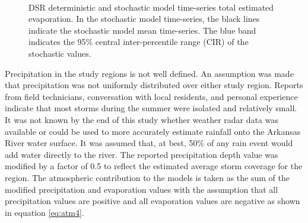 \begin{linenumbers}
\begin{landscape}
\begin{figure}
\begin{subfigure}{0.7\textwidth}
		\end{subfigure}\\
		\caption[DSR deterministic and stochastic model time-series total estimated evaporation.]{DSR deterministic and stochastic model time-series total estimated evaporation.  In the stochastic model time-series, the black lines indicate the stochastic model mean time-series.  The blue band indicates the 95\% central inter-percentile range (CIR) of the stochastic values.}
		\label{fig:reachEvap_DS}
	\end{figure}
\end{landscape}

\subtabletop
\begin{table}[htbp]
	\centering
	\caption[USR deterministic and stochastic model time-series total estimated evaporation numeric results.]{USR deterministic and stochastic model time-series total estimated evaporation numeric results.  Total daily evaporation rates are presented in units of \si{\milli\meter} (\si{\inch}).}
	\label{tab:reachEvap_US}
	
\end{table}
\tablevspace
\begin{table}[htbp]
	\centering
	\caption[DSR deterministic and stochastic model time-series total estimated evaporation numeric results.]{DSR deterministic and stochastic model time-series total estimated evaporation numeric results.  Total daily evaporation rates are presented in units of \si{\milli\meter} (\si{\inch}).}
	\label{tab:reachEvap_DS}
	
\end{table}

Precipitation in the study regions is not well defined.  An assumption was made that precipitation was not uniformly distributed over either study region.  Reports from field technicians, conversation with local residents, and personal experience indicate that most storms during the summer were isolated and relatively small.  It was not known by the end of this study whether weather radar data was available or could be used to more accurately estimate rainfall onto the Arkansas River water surface.  It was assumed that, at best, 50\% of any rain event would add water directly to the river.  The reported precipitation depth value was modified by a factor of 0.5 to reflect the estimated average storm coverage for the region.  The atmospheric contribution to the models is taken as the sum of the modified precipitation and evaporation values with the assumption that all precipitation values are positive and all evaporation values are negative as shown in equation \ref{eq:atm4}.


\end{linenumbers}
